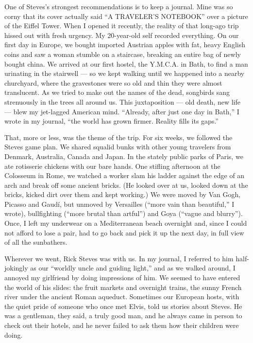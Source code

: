 One of Steves's strongest recommendations is to keep a journal. Mine was
so corny that its cover actually said ``A TRAVELER'S NOTEBOOK'' over a
picture of the Eiffel Tower. When I opened it recently, the reality of
that long-ago trip hissed out with fresh urgency. My 20-year-old self
recorded everything. On our first day in Europe, we bought imported
Austrian apples with fat, heavy English coins and saw a woman stumble on
a staircase, breaking an entire bag of newly bought china. We arrived at
our first hostel, the Y.M.C.A. in Bath, to find a man urinating in the
stairwell --- so we kept walking until we happened into a nearby
churchyard, where the gravestones were so old and thin they were almost
translucent. As we tried to make out the names of the dead, songbirds
sang strenuously in the trees all around us. This juxtaposition --- old
death, new life --- blew my jet-lagged American mind. ``Already, after
just one day in Bath,'' I wrote in my journal, ``the world has grown
firmer. Reality fills its gaps.''

That, more or less, was the theme of the trip. For six weeks, we
followed the Steves game plan. We shared squalid bunks with other young
travelers from Denmark, Australia, Canada and Japan. In the stately
public parks of Paris, we ate rotisserie chickens with our bare hands.
One stifling afternoon at the Colosseum in Rome, we watched a worker
slam his ladder against the edge of an arch and break off some ancient
bricks. (He looked over at us, looked down at the bricks, kicked dirt
over them and kept working.) We were moved by Van Gogh, Picasso and
Gaudí, but unmoved by Versailles (``more vain than beautiful,'' I
wrote), bullfighting (``more brutal than artful'') and Goya (``vague and
blurry''). Once, I left my underwear on a Mediterranean beach overnight
and, since I could not afford to lose a pair, had to go back and pick it
up the next day, in full view of all the sunbathers.

Wherever we went, Rick Steves was with us. In my journal, I referred to
him half-jokingly as our ``worldly uncle and guiding light,'' and as we
walked around, I annoyed my girlfriend by doing impressions of him. We
seemed to have entered the world of his slides: the fruit markets and
overnight trains, the sunny French river under the ancient Roman
aqueduct. Sometimes our European hosts, with the quiet pride of someone
who once met Elvis, told us stories about Steves. He was a gentleman,
they said, a truly good man, and he always came in person to check out
their hotels, and he never failed to ask them how their children were
doing.

